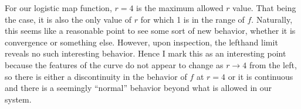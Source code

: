 \documentclass[aps,letterpaper,10pt]{article}
\begin{document}
For our logistic map function, $r=4$ is the maximum allowed $r$ value. That being the case, it is also the only value of $r$ for which 1 is in the range of $f$. Naturally, this seems like a reasonable point to see some sort of new behavior, whether it is convergence or something else. However, upon inspection, the lefthand limit reveals no such interesting behavior. Hence I mark this as an interesting point because the features of the curve do not appear to change as $r\to4$ from the left, so there is either a discontinuity in the behavior of $f$ at $r=4$ or it is continuous and there is a seemingly ``normal'' behavior beyond what is allowed in our system.





\newpage

\newpage

\end{document}
